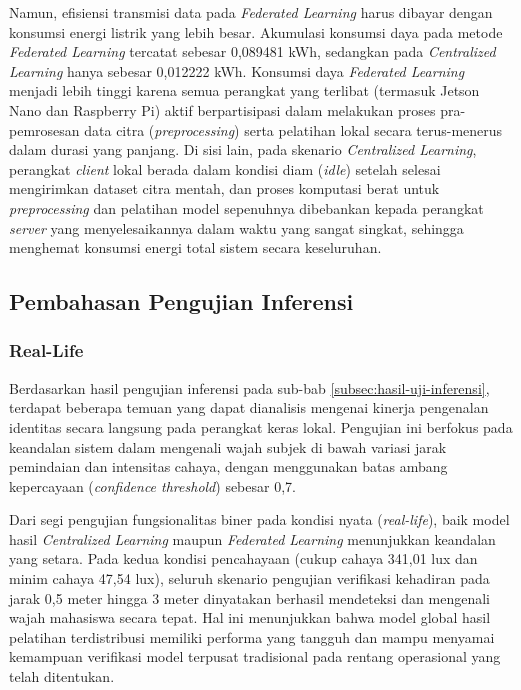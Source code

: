 Namun, efisiensi transmisi data pada \textit{Federated Learning} harus dibayar dengan konsumsi energi listrik yang lebih besar. Akumulasi konsumsi daya pada metode \textit{Federated Learning} tercatat sebesar 0,089481 kWh, sedangkan pada \textit{Centralized Learning} hanya sebesar 0,012222 kWh. Konsumsi daya \textit{Federated Learning} menjadi lebih tinggi karena semua perangkat yang terlibat (termasuk Jetson Nano dan Raspberry Pi) aktif berpartisipasi dalam melakukan proses pra-pemrosesan data citra (\textit{preprocessing}) serta pelatihan lokal secara terus-menerus dalam durasi yang panjang. Di sisi lain, pada skenario \textit{Centralized Learning}, perangkat \textit{client} lokal berada dalam kondisi diam (\textit{idle}) setelah selesai mengirimkan dataset citra mentah, dan proses komputasi berat untuk \textit{preprocessing} dan pelatihan model sepenuhnya dibebankan kepada perangkat \textit{server} yang menyelesaikannya dalam waktu yang sangat singkat, sehingga menghemat konsumsi energi total sistem secara keseluruhan.

\subsection{Pembahasan Pengujian Inferensi}
\label{subsec:pembahasan-inferensi}

\subsubsection{Real-Life}

Berdasarkan hasil pengujian inferensi pada sub-bab \ref{subsec:hasil-uji-inferensi}, terdapat beberapa temuan yang dapat dianalisis mengenai kinerja pengenalan identitas secara langsung pada perangkat keras lokal. Pengujian ini berfokus pada keandalan sistem dalam mengenali wajah subjek di bawah variasi jarak pemindaian dan intensitas cahaya, dengan menggunakan batas ambang kepercayaan (\textit{confidence threshold}) sebesar 0,7.

Dari segi pengujian fungsionalitas biner pada kondisi nyata (\textit{real-life}), baik model hasil \textit{Centralized Learning} maupun \textit{Federated Learning} menunjukkan keandalan yang setara. Pada kedua kondisi pencahayaan (cukup cahaya 341,01 lux dan minim cahaya 47,54 lux), seluruh skenario pengujian verifikasi kehadiran pada jarak 0,5 meter hingga 3 meter dinyatakan berhasil mendeteksi dan mengenali wajah mahasiswa secara tepat. Hal ini menunjukkan bahwa model global hasil pelatihan terdistribusi memiliki performa yang tangguh dan mampu menyamai kemampuan verifikasi model terpusat tradisional pada rentang operasional yang telah ditentukan.

